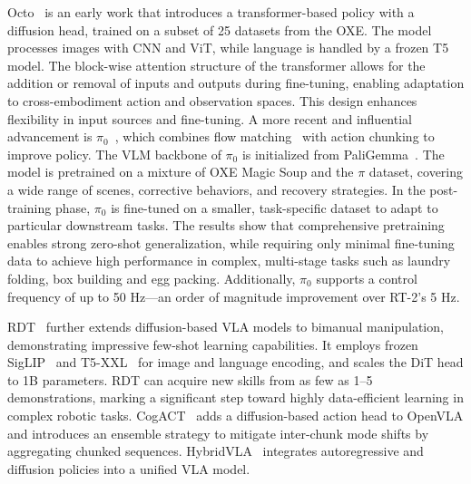 \documentclass[10pt, a4paper, logo, copyright]{googledeepmind} %
\begin{document}
Octo~\cite{Octo} is an early work that introduces a transformer-based policy with a diffusion head, trained on a subset of 25 datasets from the OXE. The model processes images with CNN and ViT, while language is handled by a frozen T5 model. The block-wise attention structure of the transformer allows for the addition or removal of inputs and outputs during fine-tuning, enabling adaptation to cross-embodiment action and observation spaces. This design enhances flexibility in input sources and fine-tuning. 
A more recent and influential advancement is $\pi_0$~\cite{black2410pi0}, which combines flow matching~\cite{lipmanflow} with action chunking to improve policy. The VLM backbone of $\pi_0$ is initialized from PaliGemma~\cite{beyer2024paligemma}. The model is pretrained on a mixture of OXE Magic Soup and the $\pi$ dataset, covering a wide range of scenes, corrective behaviors, and recovery strategies. In the post-training phase, $\pi_0$ is fine-tuned on a smaller, task-specific dataset to adapt to particular downstream tasks. The results show that comprehensive pretraining enables strong zero-shot generalization, while requiring only minimal fine-tuning data to achieve high performance in complex, multi-stage tasks such as laundry folding, box building and egg packing. Additionally, $\pi_0$ supports a control frequency of up to 50 Hz—an order of magnitude improvement over RT-2’s 5 Hz.


RDT~\cite{liu2024rdt} further extends diffusion-based VLA models to bimanual manipulation, demonstrating impressive few-shot learning capabilities. It employs frozen SigLIP~\cite{zhai2023sigmoid} and T5-XXL~\cite{raffel2020exploring} for image and language encoding, and scales the DiT head to 1B parameters. RDT can acquire new skills from as few as 1–5 demonstrations, marking a significant step toward highly data-efficient learning in complex robotic tasks. 
CogACT~\cite{li2024cogact} adds a diffusion-based action head to OpenVLA and introduces an ensemble strategy to mitigate inter-chunk mode shifts by aggregating chunked sequences.
HybridVLA~\cite{HybridVLA} integrates autoregressive and diffusion policies into a unified VLA model.
\end{document}
